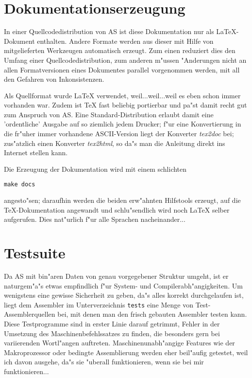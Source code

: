 \documentclass[12pt,a4paper,twoside]{report}
\begin{document}
{%

\section{Dokumentationserzeugung}

In einer Quellcodedistribution von AS ist diese Dokumentation nur als
LaTeX-Dokument enthalten.  Andere Formate werden aus dieser mit Hilfe von
mitgelieferten Werkzeugen automatisch erzeugt.  Zum einen reduziert dies
den Umfang einer Quellcodedistribution, zum anderen m"ussen "Anderungen
nicht an allen Formatversionen eines Dokumentes parallel vorgenommen
werden, mit all den Gefahren von Inkonsistenzen.  

Als Quellformat wurde LaTeX verwendet, weil...weil...weil es eben schon
immer vorhanden war.  Zudem ist TeX fast beliebig portierbar und pa"st
damit recht gut zum Anspruch von AS.  Eine Standard-Distribution erlaubt
damit eine 'ordentliche' Ausgabe auf so ziemlich jedem Drucker; f"ur eine
Konvertierung in die fr"uher immer vorhandene ASCII-Version liegt der
Konverter {\em tex2doc} bei; zus"atzlich einen Konverter {\em tex2html},
so da"s man die Anleitung direkt ins Internet stellen kann.  

Die Erzeugung der Dokumentation wird mit einem schlichten 
\begin{verbatim}
make docs
\end{verbatim}
angesto"sen; daraufhin werden die beiden erw"ahnten Hilfstools erzeugt,
auf die TeX-Dokumentation angewandt und schlu"sendlich wird noch LaTeX
selber aufgerufen.  Dies nat"urlich f"ur alle Sprachen nacheinander...


\section{Testsuite}

Da AS mit bin"aren Daten von genau vorgegebener Struktur umgeht, ist er
naturgem"a"s etwas empfindlich f"ur System- und Compilerabh"angigkeiten. 
Um wenigstens eine gewisse Sicherheit zu geben, da"s alles korrekt
durchgelaufen ist, liegt dem Assembler im Unterverzeichnis {\tt tests}
eine Menge von Test-Assemblerquellen bei, mit denen man den frisch
gebauten Assembler testen kann.  Diese Testprogramme sind in erster Linie
darauf getrimmt, Fehler in der Umsetzung des Maschinenbefehlssatzes zu
finden, die besonders gern bei variierenden Wortl"angen auftreten. 
Maschinenunabh"angige Features wie der Makroprozessor oder bedingte
Assemblierung werden eher beil"aufig getestet, weil ich davon ausgehe,
da"s sie "uberall funktionieren, wenn sie bei mir funktionieren...

}
\end{document}
